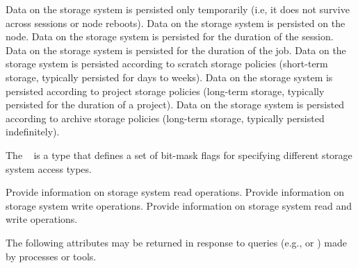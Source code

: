\begin{constantdesc}
%
Data on the storage system is persisted only temporarily (i.e, it does not survive across sessions or node reboots).
%
Data on the storage system is persisted on the node.
%
Data on the storage system is persisted for the duration of the session.
%
Data on the storage system is persisted for the duration of the job.
%
Data on the storage system is persisted according to scratch storage policies (short-term storage, typically persisted for days to weeks).
%
Data on the storage system is persisted according to project storage policies (long-term storage, typically persisted for the duration of a project).
%
Data on the storage system is persisted according to archive storage policies (long-term storage, typically persisted indefinitely).
%
\end{constantdesc}


The ~\provisionalMarker{} is a  type that defines a set of bit-mask flags for specifying different storage system access types.

\begin{constantdesc}
%
Provide information on storage system read operations.
%
Provide information on storage system write operations.
%
Provide information on storage system read and write operations.
%
\end{constantdesc}


\label{api:struct:attributes:pstrg}

The following attributes may be returned in response to queries (e.g.,  or ) made by processes or tools.

